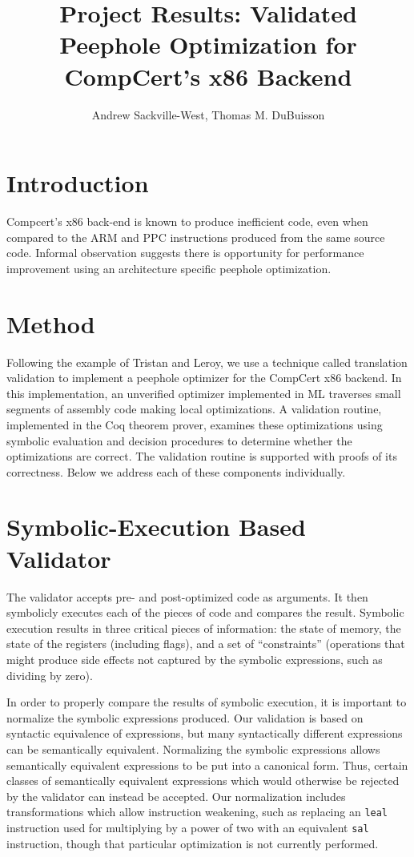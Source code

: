\documentclass{article}
\title{Project Results: Validated Peephole Optimization for CompCert's x86 Backend}
\author{Andrew Sackville-West, Thomas M. DuBuisson}
\begin{document}
\maketitle

\section{Introduction}

Compcert's x86 back-end is known to produce inefficient code, even
when compared to the ARM and PPC instructions produced from the same
source code.  Informal observation suggests there is opportunity for
performance improvement using an architecture specific peephole
optimization.

\section{Method}

Following the example of Tristan and Leroy, we use a technique called
translation validation to implement a peephole optimizer for the
CompCert x86 backend. In this implementation, an unverified optimizer
implemented in ML traverses small segments of assembly code making
local optimizations. A validation routine, implemented in the Coq
theorem prover, examines these optimizations using symbolic evaluation
and decision procedures to determine whether the optimizations are
correct. The validation routine is supported with proofs of its
correctness.  Below we address each of these components individually.

\section{Symbolic-Execution Based Validator}

The validator accepts pre- and post-optimized code as arguments.
It then symbolicly executes each of the pieces of code and compares
the result.  Symbolic execution results in three critical pieces of
information: the state of memory, the state of the registers
(including flags), and a set of ``constraints'' (operations that might
produce side effects not captured by the symbolic expressions, such as
dividing by zero).

In order to properly compare the results of symbolic execution, it is
important to normalize the symbolic expressions produced. Our
validation is based on syntactic equivalence of expressions, but many
syntactically different expressions can be semantically
equivalent. Normalizing the symbolic expressions allows semantically
equivalent expressions to be put into a canonical form. Thus, certain
classes of semantically equivalent expressions which would otherwise
be rejected by the validator can instead be accepted. Our
normalization includes transformations which allow instruction
weakening, such as replacing an {\tt leal} instruction used for
multiplying by a power of two with an equivalent {\tt sal}
instruction, though that particular optimization is not currently
performed.
\end{document}
